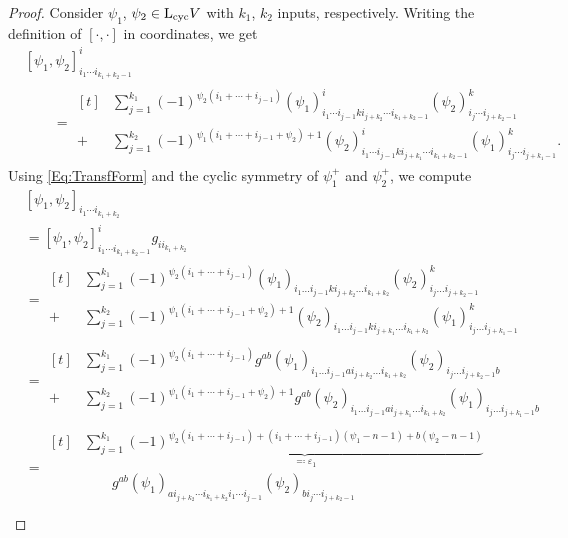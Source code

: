 \documentclass[\MainFolder/Text.tex]{subfiles}
\begin{document}
\begin{proof}
Consider $\psi_1$, $\psi_2 \in \mathrm{L}_{\mathrm{cyc}} V$ with $k_1$, $k_2$ inputs, respectively. Writing the definition of $[\cdot,\cdot]$ in coordinates, we get 
\begin{align*}
&[\psi_1,\psi_2]^i_{i_1 \dotsb i_{k_1 + k_2-1}} \\
&\qquad=\begin{aligned}[t]
&\sum_{j=1}^{k_1} (-1)^{\psi_2(i_1 + \dotsb + i_{j-1})}(\psi_1)^i_{i_{1} \dotsb i_{j-1} k i_{j+k_2} \dotsb i_{k_1 + k_2 -1}} (\psi_2)^k_{i_{j} \dotsb i_{j+k_2 - 1}} \\ {}+&\sum_{j=1}^{k_2} (-1)^{\psi_1(i_1 + \dotsb + i_{j-1} + \psi_2) + 1}(\psi_2)^i_{i_{1} \dotsb i_{j-1} k i_{j+k_1} \dotsb i_{k_1 + k_2 -1}} (\psi_1)^k_{i_{j} \dotsb i_{j+k_1 - 1}}.
\end{aligned}
\end{align*}
Using \eqref{Eq:TransfForm} and the cyclic symmetry of $\psi_1^+$ and $\psi_2^+$, we compute
\begin{align*}
&[\psi_1,\psi_2]_{i_1 \dotsb i_{k_1 + k_2}} \\ 
&= [\psi_1,\psi_2]^i_{i_1 \dotsb i_{k_1 + k_2 -1}}g_{i i_{k_1 + k_2}}  \\
&=\begin{aligned}[t]
&\sum_{j=1}^{k_1} (-1)^{\psi_2(i_1 + \dotsb + i_{j-1})} (\psi_1)_{i_1 \dotsc i_{j-1} k i_{j+k_2} \dotsc i_{k_1 + k_2}} (\psi_2)^k_{i_j \dotsc i_{j+k_2-1}} \\
+ &\sum_{j=1}^{k_2} (-1)^{\psi_1(i_1 + \dotsb + i_{j-1}+\psi_2)+1} (\psi_2)_{i_1 \dotsc i_{j-1} k i_{j+k_1} \dotsc i_{k_1 + k_2}} (\psi_1)^k_{i_j \dotsc i_{j+k_1-1}}
\end{aligned}\\
& = \begin{aligned}[t] &\sum_{j=1}^{k_1} (-1)^{\psi_2(i_1 + \dotsb + i_{j-1})} g^{ab}(\psi_1)_{i_1 \dotsc i_{j-1} a i_{j+k_2} \dotsc i_{k_1 + k_2}} (\psi_2)_{i_j \dotsc i_{j+k_2-1} b} \\
+&\sum_{j=1}^{k_2} (-1)^{\psi_1(i_1 + \dotsb + i_{j-1} + \psi_2)+1} g^{ab} (\psi_2)_{i_1 \dotsc i_{j-1} a i_{j+k_1} \dotsc i_{k_1 + k_2}} (\psi_1)_{i_j \dotsc i_{j+k_1-1} b}
\end{aligned}\\
& = \begin{aligned}[t]
&\sum_{j=1}^{k_1} \underbrace{(-1)^{\psi_2(i_1+\dotsb+i_{j-1}) + (i_1 + \dotsb + i_{j-1})(\psi_1 - n -1) + b(\psi_2 - n - 1)}}_{\eqqcolon\varepsilon_1} \\
&\qquad g^{ab} (\psi_1)_{a i_{j+k_2}\dotsb i_{k_1+k_2} i_1 \dotsb i_{j-1}}(\psi_2)_{b i_j \dotsb i_{j+k_2-1}}  \\

\end{aligned}
\end{align*}
\end{proof}
\end{document}

